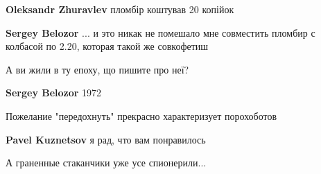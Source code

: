 \begin{itemize}
\begin{itemize}
\textbf{Oleksandr Zhuravlev} пломбір коштував 20 копійок

 
\textbf{Sergey Belozor} ... и это никак не помешало мне совместить пломбир с колбасой по 2.20, которая такой же совкофетиш

 
А ви жили в ту епоху, що пишите про неї?

 
\textbf{Sergey Belozor} 1972

 
Пожелание "передохнуть" прекрасно характеризует порохоботов

 
\textbf{Pavel Kuznetsov} я рад, что вам понравилось
\end{itemize}

 
А граненные стаканчики уже усе спионерили...🤣🤣🤣

 

\end{itemize}
